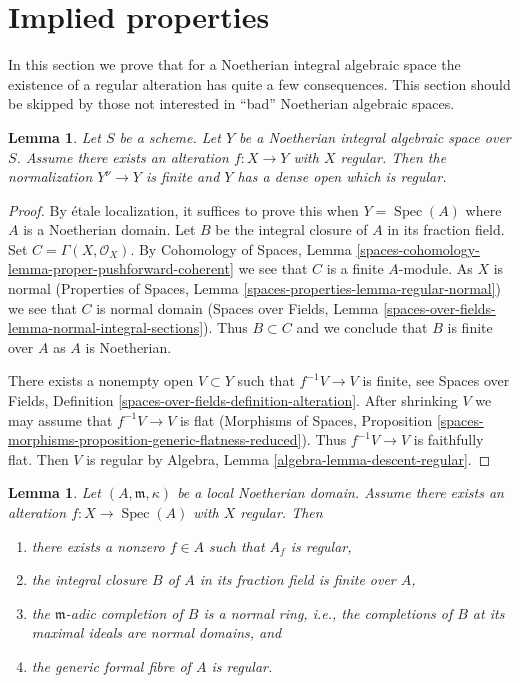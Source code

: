 \documentclass{stacks-project}
\theoremstyle{plain}
\newtheorem{lemma}[subsection]{Lemma}
\theoremstyle{definition}
\theoremstyle{remark}
\numberwithin{equation}{subsection}
\def\Spec{\mathop{\mathrm{Spec}}}
\begin{document}
\section{Implied properties}
\label{section-existence-gives}

\noindent
In this section we prove that for a Noetherian integral algebraic space
the existence of a regular alteration has quite a few consequences.
This section should be skipped by those not interested in ``bad''
Noetherian algebraic spaces.

\begin{lemma}
\label{lemma-regular-alteration-implies}
Let $S$ be a scheme. Let $Y$ be a Noetherian integral algebraic space
over $S$. Assume there exists an alteration
$f : X \to Y$ with $X$ regular. Then the normalization $Y^\nu \to Y$
is finite and $Y$ has a dense open which is regular.
\end{lemma}

\begin{proof}
By \'etale localization, it suffices to prove this when
$Y = \Spec(A)$ where $A$ is a Noetherian domain.
Let $B$ be the integral closure of $A$ in its fraction field.
Set $C = \Gamma(X, \mathcal{O}_X)$. By
Cohomology of Spaces, Lemma
\ref{spaces-cohomology-lemma-proper-pushforward-coherent}
we see that $C$ is a finite $A$-module.
As $X$ is normal
(Properties of Spaces, Lemma
\ref{spaces-properties-lemma-regular-normal})
we see that $C$ is normal domain
(Spaces over Fields, Lemma
\ref{spaces-over-fields-lemma-normal-integral-sections}).
Thus $B \subset C$ and we conclude that $B$ is finite over $A$
as $A$ is Noetherian.

\medskip\noindent
There exists a nonempty open $V \subset Y$ such that $f^{-1}V \to V$
is finite, see Spaces over Fields, Definition
\ref{spaces-over-fields-definition-alteration}.
After shrinking $V$ we may assume that $f^{-1}V \to V$ is flat
(Morphisms of Spaces, Proposition
\ref{spaces-morphisms-proposition-generic-flatness-reduced}).
Thus $f^{-1}V \to V$ is faithfully flat. Then $V$ is regular by
Algebra, Lemma \ref{algebra-lemma-descent-regular}.
\end{proof}

\begin{lemma}
\label{lemma-regular-alteration-implies-local}
Let $(A, \mathfrak m, \kappa)$ be a local Noetherian domain.
Assume there exists an alteration $f : X \to \Spec(A)$
with $X$ regular. Then
\begin{enumerate}
\item there exists a nonzero $f \in A$ such that $A_f$ is regular,
\item the integral closure $B$ of $A$ in its fraction field is finite over $A$,
\item the $\mathfrak m$-adic completion of $B$ is a normal ring, i.e., the
completions of $B$ at its maximal ideals are normal domains, and
\item the generic formal fibre of $A$ is regular.
\end{enumerate}
\end{lemma}
\end{document}
